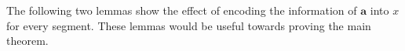 \documentclass[a4paper,UKenglish,cleveref,autoref,thm-restate]{lipics-v2021}
\renewcommand{\dim}{{\mathrm{dim}}}
\begin{document}
The following two lemmas show the effect of encoding the information of $\mathbf{a}$ into $x$ for every segment. These lemmas would be useful towards proving the main theorem. 
\end{document}
